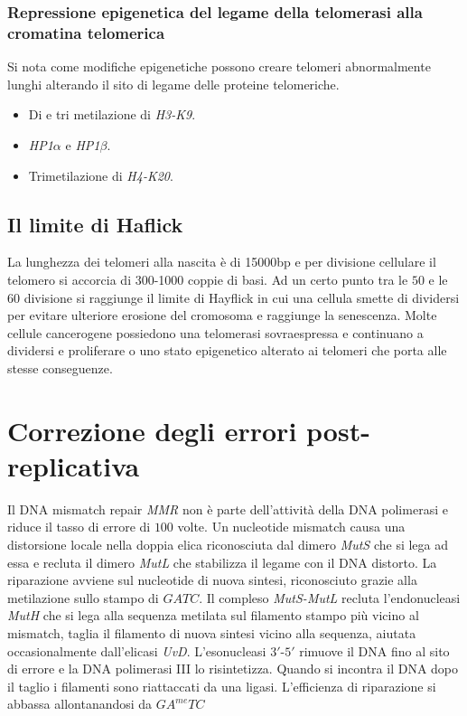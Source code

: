 	\subsubsection{Repressione epigenetica del legame della telomerasi alla cromatina telomerica}
	Si nota come modifiche epigenetiche possono creare telomeri abnormalmente lunghi alterando il sito di legame delle proteine telomeriche.
	\begin{multicols}{2}
		\begin{itemize}
			\item Di e tri metilazione di \emph{H3-K9}.
			\item \emph{HP1$\alpha$} e \emph{HP1$\beta$}.
			\item Trimetilazione di \emph{H4-K20}.
		\end{itemize}
	\end{multicols}
\subsection{Il limite di Haflick}
La lunghezza dei telomeri alla nascita \`e di \num{15000}\si{bp} e per divisione cellulare il telomero si accorcia di $300$-\num{1000} coppie di basi. Ad un certo punto tra le $50$ e le
$60$ divisione si raggiunge il limite di Hayflick in cui una cellula smette di dividersi per evitare ulteriore erosione del cromosoma e raggiunge la senescenza. Molte cellule 
cancerogene possiedono una telomerasi sovraespressa e continuano a dividersi e proliferare o uno stato epigenetico alterato ai telomeri che porta alle stesse conseguenze. 
\section{Correzione degli errori post-replicativa}
Il DNA mismatch repair \emph{MMR} non \`e parte dell'attivit\`a della DNA polimerasi e riduce il tasso di errore di $100$ volte. Un nucleotide mismatch causa una distorsione 
locale nella doppia elica riconosciuta dal dimero \emph{MutS} che si lega ad essa e recluta il dimero \emph{MutL} che stabilizza il legame con il DNA distorto. La riparazione avviene
sul nucleotide di nuova sintesi, riconosciuto grazie alla metilazione sullo stampo di $GATC$. Il compleso \emph{MutS-MutL} recluta l'endonucleasi \emph{MutH} che si lega alla 
sequenza metilata sul filamento stampo pi\`u vicino al mismatch, taglia il filamento di nuova sintesi vicino alla sequenza, aiutata occasionalmente dall'elicasi \emph{UvD}. L'esonucleasi
$3'$-$5'$ rimuove il DNA fino al sito di errore e la DNA polimerasi III lo risintetizza. Quando si incontra il DNA dopo il taglio i filamenti sono riattaccati da una ligasi. 
L'efficienza di riparazione si abbassa allontanandosi da $GA^{me}TC$
